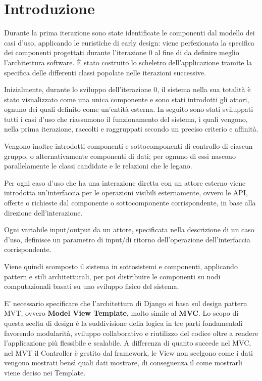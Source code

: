 \section{Introduzione}
Durante la prima iterazione sono state identificate le componenti dal modello dei casi d'uso, 
applicando le euristiche di early design: viene perfezionata la specifica dei componenti 
progettati durante l'iterazione 0 al fine di da definire meglio l'architettura software. 
È stato costruito lo scheletro dell'applicazione tramite la specifica delle differenti classi 
popolate nelle iterazioni successive.

Inizialmente, durante lo sviluppo dell'iterazione 0, il sistema nella sua totalità è stato 
visualizzato come una unica componente e sono stati 
introdotti gli attori, ognuno dei quali definito come un'entità esterna. In seguito sono stati 
sviluppati tutti i casi d'uso che riassumono il funzionamento del sistema, i quali vengono, 
nella prima iterazione, raccolti e raggruppati secondo un preciso criterio e affinità. 

Vengono inoltre introdotti componenti e sottocomponenti di controllo di ciascun gruppo, o 
alternativamente componenti di dati; per ognuno di essi nascono parallelamente le classi 
candidate e le relazioni che le legano. 

Per ogni caso d'uso che ha una interazione diretta con un attore esterno viene introdotta 
un'interfaccia per le operazioni visibili esternamente, ovvero le API, offerte o richieste 
dal componente o sottocomponente corrispondente, in base alla direzione dell'interazione. 

Ogni variabile input/output da un attore, specificata nella descrizione di un caso d'uso, 
definisce un parametro di input/di ritorno dell'operazione dell'interfaccia corrispondente. 

Viene quindi scomposto il sistema in sottosistemi e componenti, applicando pattern e 
stili architetturali, per poi distribuire le componenti su nodi computazionali basati su 
uno sviluppo fisico del sistema.


E' necessario specificare che l'architettura di Django 
si basa sul design pattern MVT, ovvero \textbf{Model View Template}, molto simile
al \textbf{MVC}. Lo scopo di questa scelta di design è la suddivisione della logica in 
tre parti fondamentali favorendo modularità, sviluppo collaborativo e riutilizzo del 
codice oltre a rendere l'applicazione più flessibile e scalabile. 
A differenza di quanto succede nel MVC, nel MVT il Controller è gestito
dal framework, le View non scelgono come i dati vengono mostrati bensì quali 
dati mostrare, di conseguenza il come mostrarli viene deciso nei Template.

